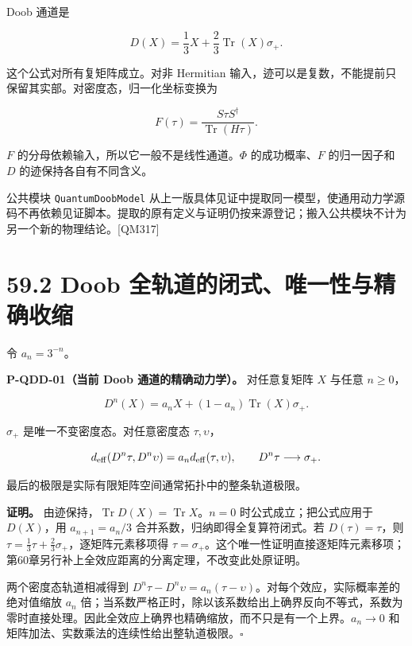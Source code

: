 \documentclass[
  11pt,
  oneside]{book}
\begin{document}
Doob 通道是

\[
D(X)=\frac13X+\frac23\operatorname{Tr}(X)\sigma_+.
\]

这个公式对所有复矩阵成立。对非 Hermitian
输入，迹可以是复数，不能提前只保留其实部。对密度态，归一化坐标变换为

\[
F(\tau)=\frac{S\tau S^\dagger}{\operatorname{Tr}(H\tau)}.
\]

\(F\) 的分母依赖输入，所以它一般不是线性通道。\(\Phi\) 的成功概率、\(F\)
的归一因子和 \(D\) 的迹保持各自有不同含义。

公共模块 \texttt{QuantumDoobModel}
从上一版具体见证中提取同一模型，使通用动力学源码不再依赖见证脚本。提取的原有定义与证明仍按来源登记；搬入公共模块不计为另一个新的物理结论。{[}QM317{]}

\hypertarget{doob-ux5168ux8f68ux9053ux7684ux95edux5f0fux552fux4e00ux6027ux4e0eux7cbeux786eux6536ux7f29}{%
\section{59.2 Doob
全轨道的闭式、唯一性与精确收缩}\label{doob-ux5168ux8f68ux9053ux7684ux95edux5f0fux552fux4e00ux6027ux4e0eux7cbeux786eux6536ux7f29}}

令 \(a_n=3^{-n}\)。

\protect\hypertarget{p-qdd-01}{}{}

\textbf{P-QDD-01（当前 Doob 通道的精确动力学）。} 对任意复矩阵 \(X\)
与任意 \(n\ge0\)，

\[
D^n(X)=a_nX+(1-a_n)\operatorname{Tr}(X)\sigma_+.
\]

\(\sigma_+\) 是唯一不变密度态。对任意密度态 \(\tau,\upsilon\)，

\[
d_{\rm eff}(D^n\tau,D^n\upsilon)
=a_n d_{\rm eff}(\tau,\upsilon),
\qquad D^n\tau\longrightarrow\sigma_+.
\]

最后的极限是实际有限矩阵空间通常拓扑中的整条轨道极限。

\textbf{证明。}
由迹保持，\(\operatorname{Tr}D(X)=\operatorname{Tr}X\)。\(n=0\)
时公式成立；把公式应用于 \(D(X)\)，用 \(a_{n+1}=a_n/3\)
合并系数，归纳即得全复算符闭式。若 \(D(\tau)=\tau\)，则
\(\tau=\frac13\tau+\frac23\sigma_+\)，逐矩阵元素移项得
\(\tau=\sigma_+\)。这个唯一性证明直接逐矩阵元素移项；第60章另行补上全效应距离的分离定理，不改变此处原证明。

两个密度态轨道相减得到
\(D^n\tau-D^n\upsilon=a_n(\tau-\upsilon)\)。对每个效应，实际概率差的绝对值缩放
\(a_n\)
倍；当系数严格正时，除以该系数给出上确界反向不等式，系数为零时直接处理。因此全效应上确界也精确缩放，而不只是有一个上界。\(a_n\to0\)
和矩阵加法、实数乘法的连续性给出整轨道极限。\(\square\)
\end{document}
